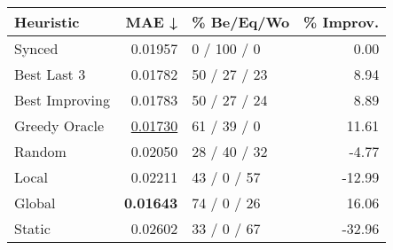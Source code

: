 \begin{tabular}{lrlr}
\toprule
\textbf{Heuristic} & \textbf{MAE ↓} & \textbf{\% Be/Eq/Wo} & \textbf{\% Improv.} \\
\midrule
            Synced &        0.01957 &          0 / 100 / 0 &                0.00 \\
\midrule
       Best Last 3 &        0.01782 &         50 / 27 / 23 &                8.94 \\
    Best Improving &        0.01783 &         50 / 27 / 24 &                8.89 \\
\addlinespace
     Greedy Oracle &        \underline{0.01730} &          61 / 39 / 0 &               11.61 \\
            Random &        0.02050 &         28 / 40 / 32 &               -4.77 \\
\midrule
             Local &        0.02211 &          43 / 0 / 57 &              -12.99 \\
            Global &        \textbf{0.01643} &          74 / 0 / 26 &               16.06 \\
\midrule
            Static &        0.02602 &          33 / 0 / 67 &              -32.96 \\
\bottomrule
\end{tabular}

\label{tab:non_lr05_le2_bs2_Summary}
